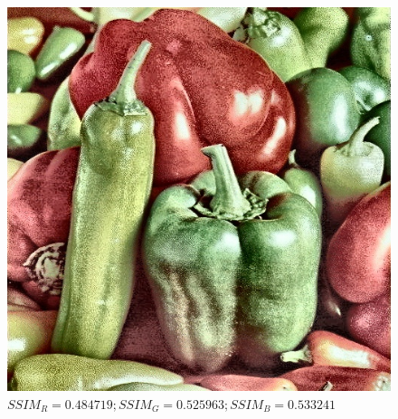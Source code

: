 \documentclass[usenames,dvipsnames]{beamer}
\begin{document}
\begin{frame}
\begin{columns}[onlytextwidth]
\begin{column}{.45\textwidth}
\begin{figure}
		  \includegraphics[width=\textwidth]{graphics/peppers_color_hc.jpg}
		  \caption{$SSIM_R=0.484719; SSIM_G=0.525963; SSIM_B=0.533241$}
		\end{figure}
\end{column}
\end{columns}

\end{frame}  
\end{document}
